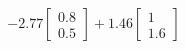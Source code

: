 \documentclass[preview]{standalone}
\begin{document}
\begin{align*}
-2.77 \begin{bmatrix} 0.8 \\ 0.5 \end{bmatrix} + 1.46 \begin{bmatrix} 1 \\ 1.6 \end{bmatrix}
\end{align*}
\end{document}
